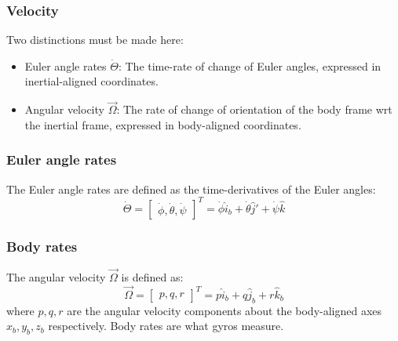 \documentclass[a4paper,12pt]{article}
\begin{document}
\subsubsection{Velocity}
Two distinctions must be made here:
\begin{itemize}
    \item Euler angle rates \( \dot{\Theta} \): The time-rate of change of Euler angles, expressed in inertial-aligned coordinates.
    \item Angular velocity \( \vec{\Omega} \): The rate of change of orientation of the body frame wrt the inertial frame, expressed in body-aligned coordinates.
\end{itemize}
\subsubsection{Euler angle rates}
The Euler angle rates are defined as the time-derivatives of the Euler angles:
\begin{equation} \nonumber
    \dot{\Theta} = \begin{bmatrix}
        \dot{\phi}, \dot{\theta}, \dot{\psi}
    \end{bmatrix}^T
     = \dot{\phi} \hat{i}_b + \dot{\theta} \hat{j}' + \dot{\psi} \hat{k}
\end{equation}

\subsubsection{Body rates}
The angular velocity \( \vec{\Omega} \) is defined as:
\begin{equation} \nonumber
    \vec{\Omega} = \begin{bmatrix}
        p, q, r
    \end{bmatrix}^T = p \hat{i}_b + q \hat{j}_b + r \hat{k}_b
\end{equation}
where \( p, q, r \) are the angular velocity components about the body-aligned axes \( x_b, y_b, z_b \) respectively. Body rates are what gyros measure.
\end{document}
